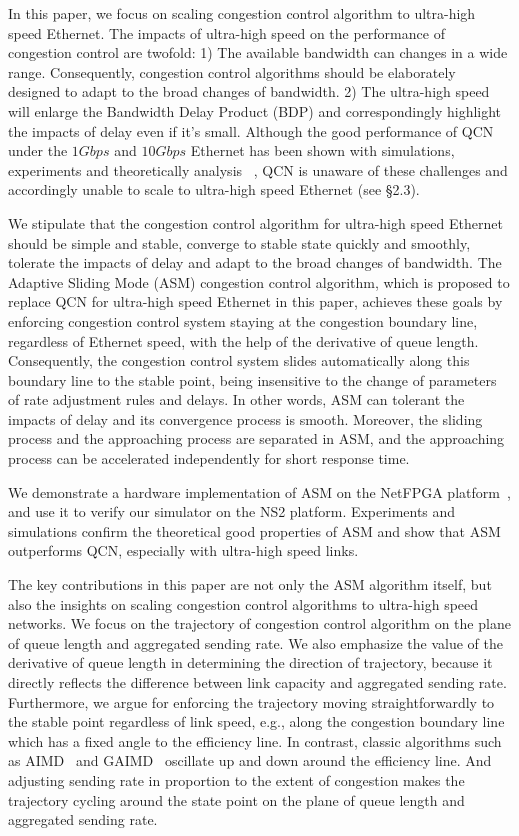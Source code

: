 \documentclass{sig-alternate-10pt}
\begin{document}
In this paper, we focus on scaling congestion control algorithm to ultra-high speed Ethernet. The impacts of ultra-high speed on the performance of congestion control are twofold: 1) The available bandwidth can changes in a wide range. Consequently, congestion control algorithms should be elaborately designed to adapt to the broad changes of bandwidth. 2) The ultra-high speed will enlarge the Bandwidth Delay Product (BDP) and correspondingly highlight the impacts of delay even if it's small. Although the good performance of QCN under the $1Gbps$ and $10Gbps$ Ethernet has been shown with simulations, experiments and theoretically analysis ~\cite{sim2,qcn-netfpga, average}, QCN is unaware of these challenges and accordingly unable to scale to ultra-high speed Ethernet (see \S2.3).


We stipulate that the congestion control algorithm for ultra-high speed Ethernet should be simple and stable, converge to stable state quickly  and smoothly, tolerate the impacts of delay and adapt to the broad changes of bandwidth. The Adaptive Sliding Mode (ASM) congestion control algorithm, which is proposed to replace QCN for ultra-high speed Ethernet in this paper, achieves these goals by enforcing congestion control system staying at the congestion boundary line, regardless of Ethernet speed, with the help of the derivative of queue length. Consequently, the congestion control system slides automatically along this boundary line to the stable point, being insensitive to the change of parameters of rate adjustment rules and  delays. In other words, ASM can tolerant the impacts of delay and its convergence process is smooth. Moreover, the sliding process and the approaching process are separated in ASM, and the approaching process can be accelerated independently for short response time. 


We demonstrate a hardware implementation of ASM on the NetFPGA platform~\cite{netfpga}, and use it to verify our simulator on the NS2 platform. Experiments and simulations confirm the theoretical good properties of ASM and show that ASM outperforms QCN, especially with ultra-high speed links.

The key contributions in this paper are not only the ASM algorithm itself, but also the insights on scaling congestion control algorithms to  ultra-high speed networks. We focus on the trajectory of congestion control algorithm on the plane of queue length and aggregated sending rate. We also emphasize the value of the derivative of queue length in determining the direction of trajectory, because it directly reflects the difference between link capacity and aggregated sending rate. Furthermore, we argue for enforcing the trajectory moving straightforwardly to the stable point regardless of link speed, e.g., along the congestion boundary line which has a fixed angle to the efficiency line. In contrast, classic algorithms such as AIMD~\cite{AIMD} and GAIMD~\cite{GAIMD} oscillate up and down around the efficiency line. And adjusting sending rate in proportion to the extent of congestion makes the trajectory cycling around the state point on the plane of queue length and aggregated sending rate. 
\end{document}
